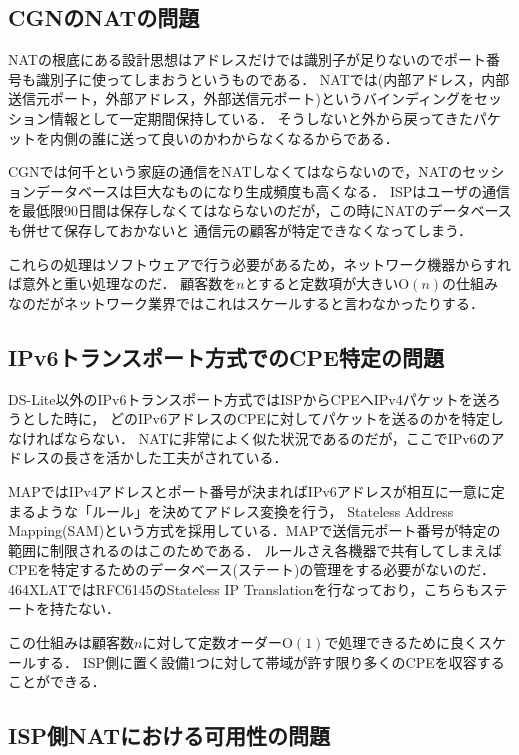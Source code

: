 \subsection{CGNのNATの問題}

NATの根底にある設計思想はアドレスだけでは識別子が足りないのでポート番号も識別子に使ってしまおうというものである．
NATでは(内部アドレス，内部送信元ポート，外部アドレス，外部送信元ポート)というバインディングをセッション情報として一定期間保持している．
そうしないと外から戻ってきたパケットを内側の誰に送って良いのかわからなくなるからである．

CGNでは何千という家庭の通信をNATしなくてはならないので，NATのセッションデータベースは巨大なものになり生成頻度も高くなる．
ISPはユーザの通信を最低限90日間は保存しなくてはならないのだが，この時にNATのデータベースも併せて保存しておかないと
通信元の顧客が特定できなくなってしまう．

これらの処理はソフトウェアで行う必要があるため，ネットワーク機器からすれば意外と重い処理なのだ．
顧客数を$n$とすると定数項が大きい$\mathrm{O}(n)$の仕組みなのだがネットワーク業界ではこれはスケールすると言わなかったりする．

\subsection{IPv6トランスポート方式でのCPE特定の問題}

DS-Lite以外のIPv6トランスポート方式ではISPからCPEへIPv4パケットを送ろうとした時に，
どのIPv6アドレスのCPEに対してパケットを送るのかを特定しなければならない．
NATに非常によく似た状況であるのだが，ここでIPv6のアドレスの長さを活かした工夫がされている．

MAPではIPv4アドレスとポート番号が決まればIPv6アドレスが相互に一意に定まるような「ルール」を決めてアドレス変換を行う，
Stateless Address Mapping(SAM)という方式を採用している．MAPで送信元ポート番号が特定の範囲に制限されるのはこのためである．
ルールさえ各機器で共有してしまえばCPEを特定するためのデータベース(ステート)の管理をする必要がないのだ．
464XLATではRFC6145のStateless IP Translationを行なっており，こちらもステートを持たない．

この仕組みは顧客数$n$に対して定数オーダー$\mathrm{O}(1)$で処理できるために良くスケールする．
ISP側に置く設備1つに対して帯域が許す限り多くのCPEを収容することができる．

\subsection{ISP側NATにおける可用性の問題}

